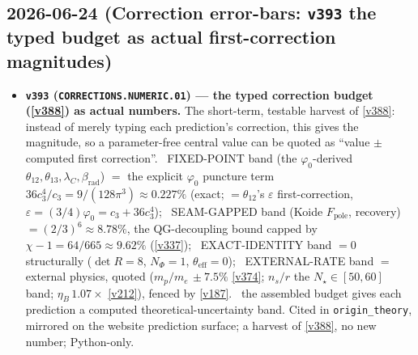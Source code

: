 \subsection*{2026-06-24 (Correction error-bars: \texttt{v393} the typed budget as actual first-correction magnitudes)}
\begin{itemize}
\item \textbf{\texttt{v393} (\texttt{CORRECTIONS.NUMERIC.01}) --- the typed correction budget (\vref{v388}) as actual
numbers.} The short-term, testable harvest of \vref{v388}: instead of merely typing each prediction's correction, this
gives the magnitude, so a parameter-free central value can be quoted as ``value $\pm$ computed first correction''.
\mE\ FIXED-POINT band (the $\varphi_0$-derived $\theta_{12},\theta_{13},\lambda_C,\beta_{\mathrm{rad}}$) $=$ the explicit
$\varphi_0$ puncture term $36c_3^4/c_3 = 9/(128\pi^3)\approx0.227\%$ (exact; $=\theta_{12}$'s $\varepsilon$
first-correction, $\varepsilon=(3/4)\varphi_0=c_3+36c_3^4$); \mE\ SEAM-GAPPED band (Koide $F_{\mathrm{pole}}$, recovery)
$=(2/3)^6\approx8.78\%$, the QG-decoupling bound capped by $\chi-1=64/665\approx9.62\%$ (\vref{v337}); \mE\
EXACT-IDENTITY band $=0$ structurally ($\det R=8$, $N_\Phi=1$, $\theta_{\mathrm{eff}}=0$); \mE\ EXTERNAL-RATE band $=$
external physics, quoted ($m_p/m_e\,{\pm}7.5\%$ \vref{v374}; $n_s/r$ the $N_\star{\in}[50,60]$ band; $\eta_B\,1.07\times$
\vref{v212}), fenced by \vref{v187}. \mC\ the assembled budget gives each prediction a computed theoretical-uncertainty
band. Cited in \texttt{origin\_theory}, mirrored on the website prediction surface; a harvest of \vref{v388}, no new
number; Python-only.
\end{itemize}

